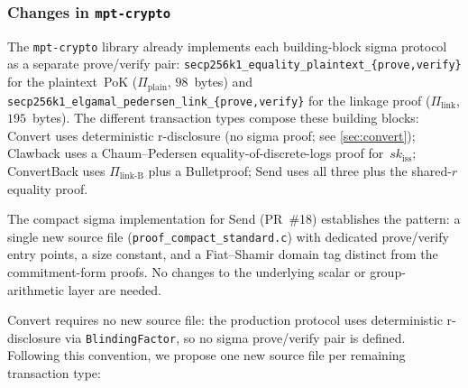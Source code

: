 \documentclass[11pt]{article}
\theoremstyle{definition}
\newcommand{\sk}{\mathit{sk}}
\begin{document}
\subsubsection*{Changes in \texttt{mpt-crypto}}

The \texttt{mpt-crypto} library already implements each building-block
sigma protocol as a separate prove/verify pair:
\texttt{secp256k1\_equality\_plaintext\_\{prove,verify\}} for the
plaintext~PoK ($\Pi_{\mathrm{plain}}$, $98$~bytes) and
\texttt{secp256k1\_elgamal\_pedersen\_link\_\{prove,verify\}} for
the linkage proof ($\Pi_{\mathrm{link}}$, $195$~bytes).
The different transaction types compose these building blocks:
Convert uses deterministic r-disclosure (no sigma proof; see
\cref{sec:convert}); Clawback uses a Chaum--Pedersen
equality-of-discrete-logs proof for~$\sk_{\mathrm{iss}}$;
ConvertBack uses
$\Pi_{\mathrm{link\text{-}B}}$ plus a
Bulletproof; Send uses all three plus the shared-$r$ equality proof.

The compact sigma implementation for Send (PR~\#18) establishes
the pattern: a single new source file
(\texttt{proof\_compact\_standard.c}) with dedicated
prove/verify entry points, a size constant, and a
Fiat--Shamir domain tag distinct from the commitment-form proofs.
No changes to the underlying scalar or group-arithmetic layer are
needed.

Convert requires no new source file: the production protocol uses
deterministic r-disclosure via \texttt{BlindingFactor}, so no sigma
prove/verify pair is defined.
Following this convention, we propose one new source file per
remaining transaction type:
\end{document}
